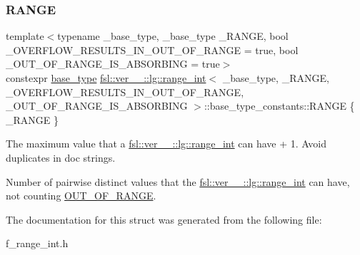 \subsubsection{\texorpdfstring{RANGE}{RANGE}}
{\footnotesize\ttfamily template$<$typename \+\_\+base\+\_\+type, \+\_\+base\+\_\+type \+\_\+\+R\+A\+N\+GE, bool \+\_\+\+O\+V\+E\+R\+F\+L\+O\+W\+\_\+\+R\+E\+S\+U\+L\+T\+S\+\_\+\+I\+N\+\_\+\+O\+U\+T\+\_\+\+O\+F\+\_\+\+R\+A\+N\+GE = true, bool \+\_\+\+O\+U\+T\+\_\+\+O\+F\+\_\+\+R\+A\+N\+G\+E\+\_\+\+I\+S\+\_\+\+A\+B\+S\+O\+R\+B\+I\+NG = true$>$ \\
constexpr \mbox{\hyperlink{classfsl_1_1ver__1__0_1_1lg_1_1range__int_aa6c763f6d72d18c8b9129c0c06628cd3}{base\+\_\+type}} \mbox{\hyperlink{classfsl_1_1ver__1__0_1_1lg_1_1range__int}{fsl\+::ver\+\_\+\_\+::lg\+::range\+\_\+int}}$<$ \+\_\+base\+\_\+type, \+\_\+\+R\+A\+N\+GE, \+\_\+\+O\+V\+E\+R\+F\+L\+O\+W\+\_\+\+R\+E\+S\+U\+L\+T\+S\+\_\+\+I\+N\+\_\+\+O\+U\+T\+\_\+\+O\+F\+\_\+\+R\+A\+N\+GE, \+\_\+\+O\+U\+T\+\_\+\+O\+F\+\_\+\+R\+A\+N\+G\+E\+\_\+\+I\+S\+\_\+\+A\+B\+S\+O\+R\+B\+I\+NG $>$\+::base\+\_\+type\+\_\+constants\+::\+R\+A\+N\+GE \{ \+\_\+\+R\+A\+N\+GE \}\hspace{0.3cm}{\ttfamily [static]}}



The maximum value that a \mbox{\hyperlink{classfsl_1_1ver__1__0_1_1lg_1_1range__int}{fsl\+::ver\+\_\+\_\+::lg\+::range\+\_\+int}} can have + 1. Avoid duplicates in doc strings. 

Number of pairwise distinct values that the \mbox{\hyperlink{classfsl_1_1ver__1__0_1_1lg_1_1range__int}{fsl\+::ver\+\_\+\_\+::lg\+::range\+\_\+int}} can have, not counting \mbox{\hyperlink{structfsl_1_1ver__1__0_1_1lg_1_1range__int_1_1base__type__constants_a40d05930eb2110c10a208dce641ba832}{O\+U\+T\+\_\+\+O\+F\+\_\+\+R\+A\+N\+GE}}. 

The documentation for this struct was generated from the following file\+:\begin{DoxyCompactItemize}
\item 
f\+\_\+range\+\_\+int.\+h\end{DoxyCompactItemize}
